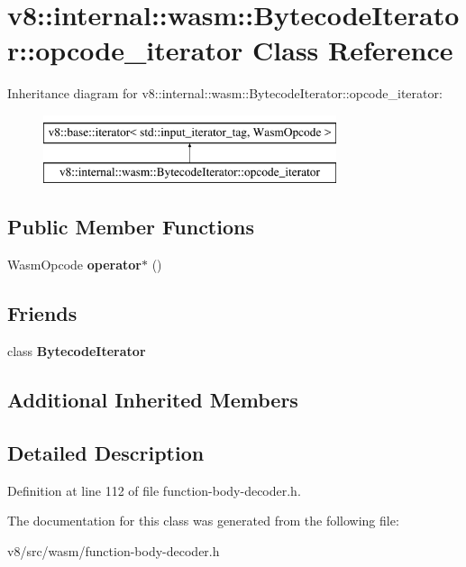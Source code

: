 \hypertarget{classv8_1_1internal_1_1wasm_1_1BytecodeIterator_1_1opcode__iterator}{}\section{v8\+:\+:internal\+:\+:wasm\+:\+:Bytecode\+Iterator\+:\+:opcode\+\_\+iterator Class Reference}
\label{classv8_1_1internal_1_1wasm_1_1BytecodeIterator_1_1opcode__iterator}
Inheritance diagram for v8\+:\+:internal\+:\+:wasm\+:\+:Bytecode\+Iterator\+:\+:opcode\+\_\+iterator\+:\begin{figure}[H]
\begin{center}
\leavevmode
\includegraphics[height=2.000000cm]{classv8_1_1internal_1_1wasm_1_1BytecodeIterator_1_1opcode__iterator}
\end{center}
\end{figure}
\subsection*{Public Member Functions}
\begin{DoxyCompactItemize}
\item 
\mbox{\label{classv8_1_1internal_1_1wasm_1_1BytecodeIterator_1_1opcode__iterator_ab724854ebadeaf47ef7c6c244a2e11c5}} 
Wasm\+Opcode {\bfseries operator$\ast$} ()
\end{DoxyCompactItemize}
\subsection*{Friends}
\begin{DoxyCompactItemize}
\item 
\mbox{\label{classv8_1_1internal_1_1wasm_1_1BytecodeIterator_1_1opcode__iterator_a9d91d360bc42ff8afc5c981013cf9266}} 
class {\bfseries Bytecode\+Iterator}
\end{DoxyCompactItemize}
\subsection*{Additional Inherited Members}


\subsection{Detailed Description}


Definition at line 112 of file function-\/body-\/decoder.\+h.



The documentation for this class was generated from the following file\+:\begin{DoxyCompactItemize}
\item 
v8/src/wasm/function-\/body-\/decoder.\+h\end{DoxyCompactItemize}
